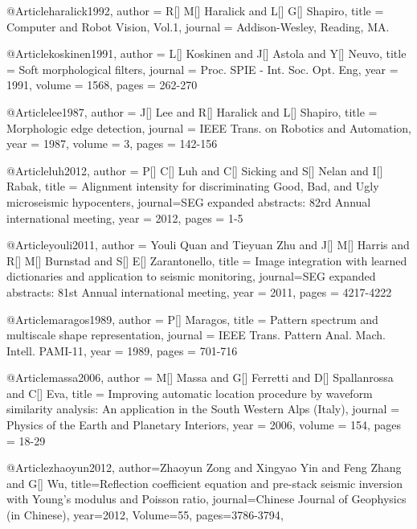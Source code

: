 @Article{haralick1992,
  author = 	 {R[] M[] Haralick and L[] G[] Shapiro},
  title = 	 {Computer and Robot Vision, Vol.1},
  journal = 	 {Addison-Wesley, Reading,
MA.}}   
  
   @Article{koskinen1991,
  author = 	 {L[] Koskinen and J[] Astola and Y[] Neuvo},
  title = 	 {Soft morphological filters},
  journal = 	 {Proc. SPIE - Int. Soc. Opt. Eng},
  year = 	 1991,
    volume = 	 1568,
  pages = 	 {262-270}}     
  
     @Article{lee1987,
  author = 	 {J[] Lee and R[] Haralick and L[] Shapiro},
  title = 	 {Morphologic edge detection},
  journal = 	 {IEEE Trans. on Robotics and
Automation},
  year = 	 1987,
  volume = 	 3,
  pages = 	 {142-156}}   

     @Article{luh2012,
  author = 	 {P[] C[] Luh and C[] Sicking and S[] Nelan and I[] Rabak},
  title = 	 {Alignment intensity for discriminating Good, Bad, and Ugly microseismic hypocenters},
  journal={SEG expanded abstracts: 82rd Annual international meeting},
  year = 	 2012,
  pages = 	 {1-5}}  

     @Article{youli2011,
  author = 	 {Youli Quan and Tieyuan Zhu and J[] M[] Harris and R[] M[] Burnstad and S[] E[] Zarantonello},
  title = 	 {Image integration with learned dictionaries and application to seismic monitoring},
  journal={SEG expanded abstracts: 81st Annual international meeting},
  year = 	 2011,
  pages = 	 {4217-4222}} 
    
     @Article{maragos1989,
  author = 	 {P[] Maragos},
  title = 	 {Pattern spectrum and multiscale shape representation},
  journal = 	 {IEEE Trans. Pattern Anal.
Mach. Intell. PAMI-11},
  year = 	 1989,
  pages = 	 {701-716}}     
  

     @Article{massa2006,
  author = 	 {M[] Massa and G[] Ferretti and D[] Spallanrossa and C[] Eva},
  title = 	 {Improving automatic location procedure by waveform similarity analysis: An application in the South Western Alps (Italy)},
  journal = 	 {Physics of the Earth and Planetary Interiors},
  year = 	 2006,
  volume = 	 154,
  pages = 	 {18-29}}  



@Article{zhaoyun2012,
  author={Zhaoyun Zong and Xingyao Yin and Feng Zhang and G[] Wu},
  title={Reflection coefficient equation and pre-stack seismic inversion with Young's modulus and Poisson ratio},
  journal={Chinese Journal of Geophysics (in Chinese)},
  year=2012,
  Volume=55,
  pages={3786-3794},
}


